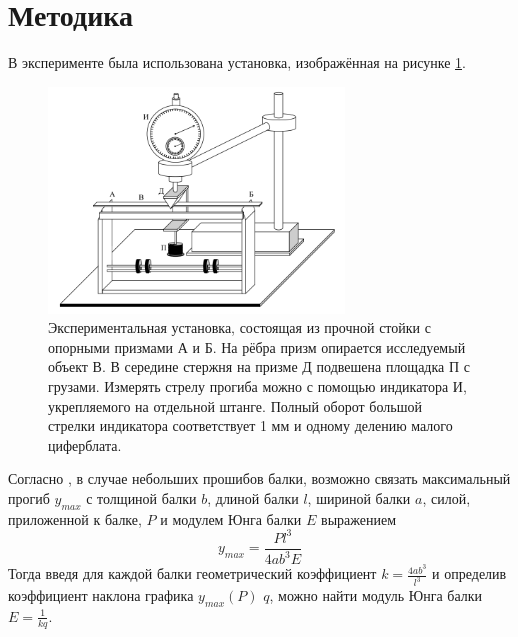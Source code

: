 \documentclass[12pt]{article}
\begin{document}
\section{Методика}
В эксперименте была использована установка, изображённая на рисунке \ref{fig:1}.
\begin{figure}
    \begin{center}
        \includegraphics[width=0.7\textwidth]{im.png}
    \end{center}
    \caption{Экспериментальная установка, состоящая из прочной стойки с опорными призмами А и Б.
        На рёбра призм опирается исследуемый объект В. В середине стержня на призме Д подвешена площадка П с грузами. 
        Измерять стрелу прогиба можно с помощью индикатора И, укрепляемого на отдельной штанге. 
        Полный оборот большой стрелки индикатора соответствует 1 мм и одному делению малого циферблата.}
    \label{fig:1}
\end{figure}
Согласно \cite{LabBook}, в случае небольших прошибов балки, возможно связать максимальный прогиб $y_{max}$ с толщиной балки $b$, длиной балки $l$,
шириной балки $a$, силой, приложенной к балке, $P$ и модулем Юнга балки $E$ выражением
\begin{equation}\label{eq:1}
    y_{max} = \frac{Pl^3}{4ab^3E}
\end{equation}
Тогда введя для каждой балки геометрический коэффициент $k = \frac{4ab^3}{l^3}$ и определив коэффициент наклона графика 
$y_{max}(P)$ $q$, можно найти модуль Юнга балки $E = \frac{1}{kq}$.
\end{document}
